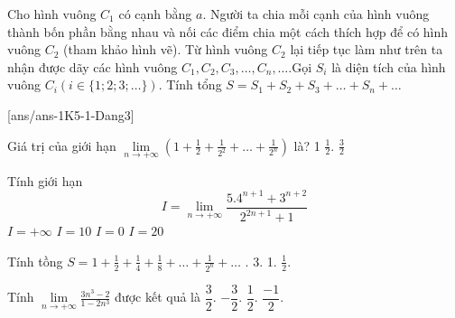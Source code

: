 \begin{bt}%
	Cho hình vuông $C_1$ có cạnh bằng $a$. Người ta chia mỗi cạnh của hình vuông thành bốn phần bằng nhau và nối các điểm chia một cách thích hợp để có hình vuông $C_2$ (tham khảo hình vẽ).
	Từ hình vuông $C_2$ lại tiếp tục làm như trên ta nhận được dãy các hình vuông $C_1, C_2, C_3, \ldots, C_n, \ldots$.Gọi $S_i$ là diện tích của hình vuông $C_i(i \in\{1 ; 2 ; 3 ; \ldots\})$. Tính tổng $S=S_1+S_2+S_3+\ldots+S_n+\ldots$
\end{bt} 
\centerline{}
[ans/ans-1K5-1-Dang3]
\begin{ex}%
	Giá trị của giới hạn $\lim \limits_{n \to +\infty}\left(1+\frac{1}{2}+\frac{1}{2^2}+\ldots+\frac{1}{2^n}\right)$ là?
\choice
{1}
{} 
{$\frac{1}{2}$.}
{$\frac{3}{2}$}
\end{ex}
\begin{ex}%
	Tính giới hạn
	$$	I=\lim \limits_{n \to +\infty}\frac{5.4^{n+1}+3^{n+2}}{2^{2 n+1}+1}$$
\choice
{$I=+\infty$}
{\True $I=10$}
{$I=0$}
{$I=20$}
\end{ex}

\begin{ex}%
	Tính tồng $S=1+\frac{1}{2}+\frac{1}{4}+\frac{1}{8}+\ldots+\frac{1}{2^n}+\ldots$
\choice
{.}
{3.}
{1.}
{$\frac{1}{2}$.}
\end{ex}
\begin{ex}%
	Tính $\lim \limits_{n \to +\infty}\frac{3 n^3-2}{1-2 n^3}$ được kết quả là
\choice
{$\dfrac{3}{2}$.}
{\True $-\dfrac{3}{2}$.}
{$\dfrac{1}{2}$.}
{$\dfrac{-1}{2}$.}
\end{ex}

